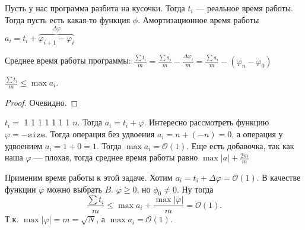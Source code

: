  \begin{definition}
     Пусть у нас программа разбита на кусочки. Тогда $t_i$ --- реальное время работы. Тогда пусть есть какая-то функция  $\phi$. Амортизационное время работы  $a_i = t_i + \overbrace{\varphi_{i+1} - \varphi_{i}}^{\Delta \varphi}$
 \end{definition}

 Среднее время работы программы: $\frac{\sum t_i}{m} = \frac{\sum a_i}{m} - \frac{\Delta \varphi_i}{m} = \frac{\sum a_i}{m} - (\varphi_n - \varphi_0)$ 
 \begin{theorem}
     $\frac{\sum t_i}{m} \le \max a_i$.
 \end{theorem}
 \begin{proof}
     Очевидно.
 \end{proof}
 $t_i=$ 1 1 1 1 1 1 1 $n$. Тогда $a_i = t_i + \varphi$. Интересно рассмотреть функцию $\varphi = -\texttt{size}$. Тогда операция без удвоения $a_i = n + (-n) = 0$, а операция у удвоением  $a_i = 1 + 0 = 1$. Тогда  $\max a_i = \mathcal{O}(1)$. Еще есть добавочка, так как наша $\varphi$ --- плохая, тогда среднее время работы равно $\max |a|  + \frac{2m}{m}$


 Применим время работы к этой задаче. Хотим $a_i = t_i + \Delta \varphi = \mathcal{O}(1)$. В качестве функции  $\varphi$ можно выбрать  $B$.  $\varphi \ge 0$, но $\phi_0 \neq 0$. Ну тогда  \[
     \frac{\sum t_i}{m} \le \max a_i + \frac{\max |\varphi|}{m} = \mathcal{O}(1)
 .\] 
 Т.к. $\max |\varphi| = m = \sqrt{N}$, а  $\max a_i = \mathcal{O}(1)$.
